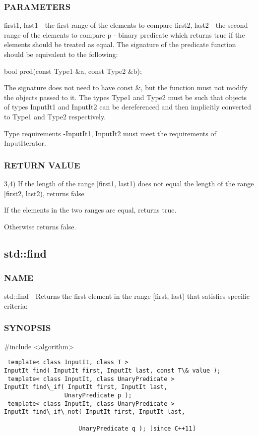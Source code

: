 \subsubsection{PARAMETERS}
first1, last1 - the first range of the elements to compare
first2, last2 - the second range of the elements to compare
p - binary predicate which returns true  if the elements should be treated as equal.
The signature of the predicate function should be equivalent to the following:

 bool pred(const Type1 \&a, const Type2 \&b);

The signature does not need to have const \&, but the function must not modify the objects passed to it.
The types Type1 and Type2 must be such that objects of types InputIt1 and InputIt2 can be dereferenced and then implicitly converted to Type1 and Type2 respectively.


 Type requirements
 -InputIt1, InputIt2 must meet the requirements of InputIterator.

\subsubsection{RETURN VALUE}
3,4) If the length of the range [first1, last1) does not equal the length of the range [first2, last2), returns false

If the elements in the two ranges are equal, returns true.

Otherwise returns false.



\subsection{std::find}

\subsubsection{NAME}
std::find - Returns the first element in the range [first, last) that satisfies specific criteria:

\subsubsection{SYNOPSIS}
\#include <algorithm>

\begin{lstlisting}
 template< class InputIt, class T >
InputIt find( InputIt first, InputIt last, const T\& value );
 template< class InputIt, class UnaryPredicate >
InputIt find\_if( InputIt first, InputIt last,
                 UnaryPredicate p );
 template< class InputIt, class UnaryPredicate >
InputIt find\_if\_not( InputIt first, InputIt last,

                     UnaryPredicate q ); [since C++11]
\end{lstlisting}

